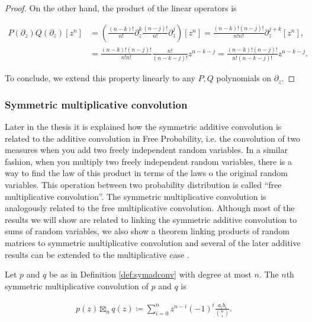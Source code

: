 \begin{proof}
    On the other hand, the product of the linear operators is 

    \begin{align*}
        P(\partial_z)Q(\partial_z)[z^n] &= \left(\frac{(n-k)!}{n!}\partial_z^k \frac{(n-j)!}{n!}\partial_z^j\right)[z^n] = \frac{(n-k)!(n-j)!}{n!n!} \partial_z^{j+k}[z^n], \\
        &= \frac{(n-k)!(n-j)!}{n!n!} \frac{n!}{(n-k-j)!}z^{n-k-j} = \frac{(n-k)!(n-j)!}{n!(n-k-j)!}z^{n-k-j}.
    \end{align*}

    To conclude, we extend this property linearly to any $P,Q$ polynomials on $\partial_z$. 
\end{proof}

\subsubsection{Symmetric multiplicative convolution}

Later in the thesis it is explained how the symmetric additive convolution is related to the additive convolution in Free Probability, i.e. the convolution of two measures when you add two freely independent random variables. In a similar fashion, when you multiply two freely independent random variables, there is a way to find the law of this product in terms of the laws o the original random variables. This operation between two probability distribution is called ``free multiplicative convolution''. The symmetric multiplicative convolution is analogously related to the free multiplicative convolution. Although most of the results we will show are related to linking the symmetric additive convolution to sums of random variables, we also show a theorem linking products of random matrices to symmetric multiplicative convolution and several of the later additive results can be extended to the multiplicative case .

\begin{definition}
    Let $p$ and $q$ be as in Definition \ref{def:symadconv} with degree at most $n$. The $n$th symmetric multiplicative convolution of $p$ and $q$ is 

    \begin{align*}
        p(z) \boxtimes_n q(z) \coloneqq \sum_{i=0}^n z^{n-i}(-1)^i\frac{a_ib_i}{\binom ni}.
    \end{align*}
\end{definition}

